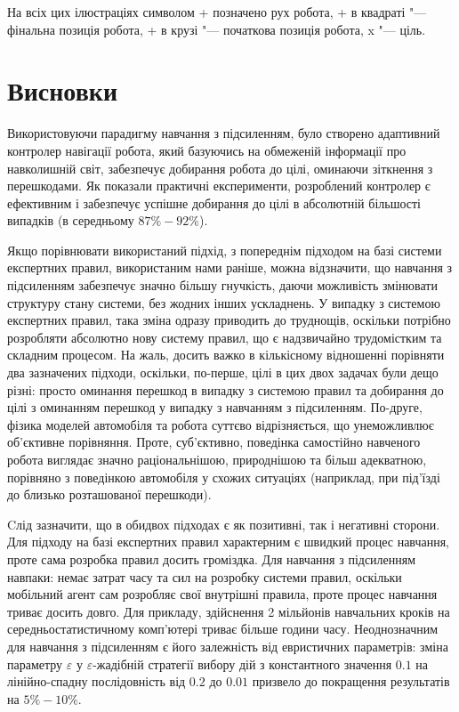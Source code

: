 \documentclass[a4paper,10pt,fleqn]{article}
\begin{document}
На всіх цих ілюстраціях символом + позначено рух робота, + в квадраті "--- фінальна позиція робота, + в крузі "--- початкова позиція робота, x "--- ціль.

\section{Висновки}

Використовуючи парадигму навчання з підсиленням, було створено адаптивний контролер навігації робота, який базуючись на обмеженій інформації про навколишній світ, забезпечує добирання робота до цілі, оминаючи зіткнення з перешкодами. Як показали практичні експерименти, розроблений контролер є ефективним і забезпечує успішне добирання до цілі в абсолютній більшості випадків (в середньому $87\%-92\%$).

Якщо порівнювати використаний підхід, з попереднім підходом на базі системи експертних правил, використаним нами раніше, можна відзначити, що навчання з підсиленням забезпечує значно більшу гнучкість, даючи можливість змінювати структуру стану системи, без жодних інших ускладнень. У випадку з системою експертних правил, така зміна одразу приводить до труднощів, оскільки потрібно розробляти абсолютно нову систему правил, що є надзвичайно трудомістким та складним процесом. На жаль, досить важко в кількісному відношенні порівняти два зазначених підходи, оскільки, по-перше, цілі в цих двох задачах були дещо різні: просто оминання перешкод в випадку з системою правил та добирання до цілі з оминанням перешкод у випадку з навчанням з підсиленням. По-друге, фізика моделей автомобіля та робота суттєво відрізняється, що унеможливлює об'єктивне порівняння. Проте, суб'єктивно, поведінка самостійно навченого робота виглядає значно раціональнішою, природнішою та більш адекватною, порівняно з поведінкою автомобіля у схожих ситуаціях (наприклад, при під'їзді до близько розташованої перешкоди).

Cлід зазначити, що в обидвох підходах є як позитивні, так і негативні сторони. Для підходу на базі експертних правил характерним є швидкий процес навчання, проте сама розробка правил досить громіздка. Для навчання з підсиленням навпаки: немає затрат часу та сил на розробку системи правил, оскільки мобільний агент сам розробляє свої внутрішні правила, проте процес навчання триває досить довго. Для прикладу, здійснення 2 мільйонів навчальних кроків на середньостатистичному комп'ютері триває більше години часу. Неоднозначним для навчання з підсиленням є його залежність від евристичних параметрів: зміна параметру $\varepsilon$ у $\varepsilon$-жадібній стратегії вибору дій з константного значення $0.1$ на лінійно-спадну послідовність від $0.2$ до $0.01$ призвело до покращення результатів на $5\%-10\%$.
\end{document}
